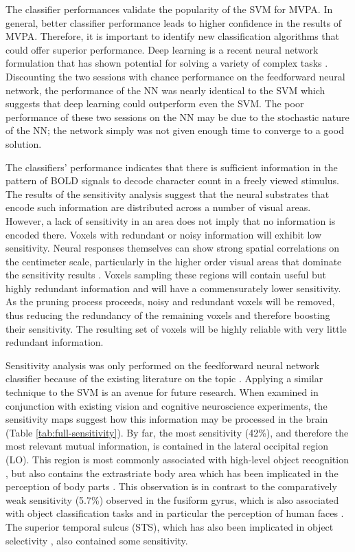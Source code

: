 \documentclass[5p,authoryear]{elsarticle}
\begin{document}
The classifier performances validate the popularity of the SVM for MVPA.
In general, better classifier performance leads to higher confidence in the results of MVPA.
Therefore, it is important to identify new classification algorithms that could offer superior performance.
Deep learning \citep{Hinton2006} is a recent neural network formulation that has shown potential for solving a variety of complex tasks \citep{Ciresan2012}.
Discounting the two sessions with chance performance on the feedforward neural network, the performance of the NN was nearly identical to the SVM which suggests that deep learning could outperform even the SVM.
The poor performance of these two sessions on the NN may be due to the stochastic nature of the NN; the network simply was not given enough time to converge to a good solution.

The classifiers' performance indicates that there is sufficient information in the pattern of BOLD signals to decode character count in a freely viewed stimulus. 
The results of the sensitivity analysis suggest that the neural substrates that encode such information are distributed across a number of visual areas.
However, a lack of sensitivity in an area does not imply that no information is encoded there.
Voxels with redundant or noisy information will exhibit low sensitivity.
Neural responses themselves can show strong spatial correlations on the centimeter scale, particularly in the higher order visual areas that dominate the sensitivity results \citep{Engel1997}. 
Voxels sampling these regions will contain useful but highly redundant information and will have a commensurately lower sensitivity.
As the pruning process proceeds, noisy and redundant voxels will be removed, thus reducing the redundancy of the remaining voxels and therefore boosting their sensitivity.
The resulting set of voxels will be highly reliable with very little redundant information.

Sensitivity analysis was only performed on the feedforward neural network classifier because of the existing literature on the topic \citep{Zurada1994}.
Applying a similar technique to the SVM is an avenue for future research.
When examined in conjunction with existing vision and cognitive neuroscience experiments, the sensitivity maps suggest how this information may be processed in the brain (Table \ref{tab:full-sensitivity}).
By far, the most sensitivity (42\%), and therefore the most relevant mutual information, is contained in the lateral occipital region (LO).
This region is most commonly associated with high-level object recognition \citep{Grill-Spector2001}, but also contains the extrastriate body area which has been implicated in the perception of body parts \citep{Astafiev2004}.
This observation is in contrast to the comparatively weak sensitivity (5.7\%) observed in the fusiform gyrus, which is also associated with object classification tasks and in particular the perception of human faces \citep{Kanwisher1997,Sayres2010}.
The superior temporal sulcus (STS), which has also been implicated in object selectivity \citep{Hasselmo1989,Beauchamp2004}, also contained some sensitivity. 
\end{document}
